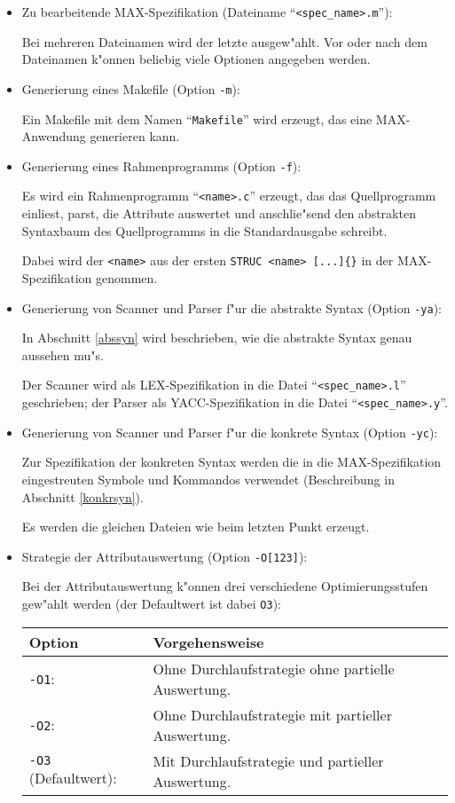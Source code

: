 \begin{itemize}
\item Zu bearbeitende MAX-Spezifikation (Dateiname "`{\tt <spec\_name>.m}"'):

Bei mehreren Dateinamen wird der letzte ausgew"ahlt.
Vor oder nach dem Dateinamen k"onnen beliebig viele Optionen angegeben
werden.

\item Generierung eines Makefile (Option {\tt -m}):

Ein Makefile mit dem Namen "`{\tt Makefile}"' wird erzeugt, das
eine MAX-Anwendung generieren kann.

\item Generierung eines Rahmenprogramms (Option {\tt -f}):

Es wird ein Rahmenprogramm "`{\tt <name>.c}"' erzeugt, das
das Quellprogramm einliest, parst, die Attribute auswertet
und anschlie"send den abstrakten Syntaxbaum des Quellprogramms
in die Standardausgabe schreibt.

Dabei wird der {\tt <name>} aus der ersten \mbox{\tt STRUC <name> [...]\{\}}
in der MAX-Spezifikation genommen.

\item Generierung von Scanner und Parser f"ur die abstrakte Syntax
(Option {\tt -ya}):

In Abschnitt \ref{abssyn} wird beschrieben, wie die abstrakte
Syntax genau aussehen mu"s.

Der Scanner wird als LEX-Spezifikation in die Datei "`{\tt <spec\_name>.l}"'
geschrieben; der Parser als YACC-Spezifikation in die Datei
"`{\tt <spec\_name>.y}"'.

\item Generierung von Scanner und Parser f"ur die konkrete Syntax
(Option {\tt -yc}):

Zur Spezifikation der konkreten Syntax werden die in die MAX-Spezifikation
eingestreuten Symbole und Kommandos verwendet (Beschreibung in Abschnitt
\ref{konkrsyn}).

Es werden die gleichen Dateien wie beim letzten Punkt erzeugt.

\item Strategie der Attributauswertung (Option {\tt -O[123]}):

Bei der Attributauswertung k"onnen drei verschiedene Optimierungsstufen
gew"ahlt werden (der Defaultwert ist dabei {\tt O3}):

\begin{tabular}{ll}
Option & Vorgehensweise\\
\hline
{\tt -O1}: & Ohne Durchlaufstrategie ohne partielle Auswertung.\\
{\tt -O2}: & Ohne Durchlaufstrategie mit partieller Auswertung.\\
{\tt -O3} (Defaultwert): & Mit Durchlaufstrategie und partieller Auswertung.
\end{tabular}


\end{itemize}
